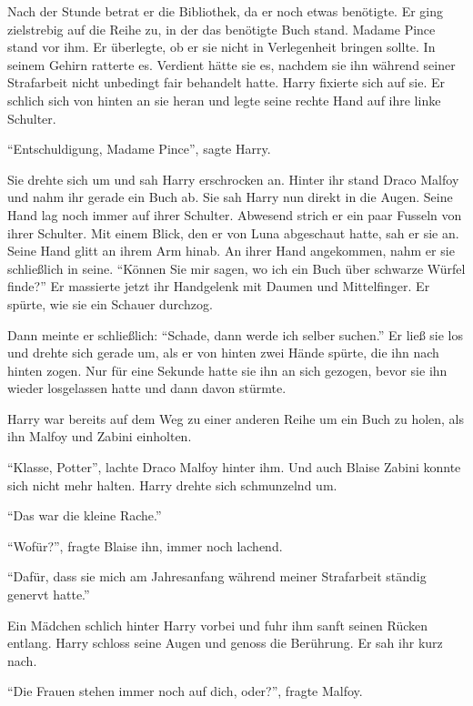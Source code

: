 Nach der Stunde betrat er die Bibliothek, da er noch etwas benötigte. Er ging zielstrebig auf die Reihe zu, in der das benötigte Buch stand. Madame Pince stand vor ihm. Er überlegte, ob er sie nicht in Verlegenheit bringen sollte. In seinem Gehirn ratterte es. Verdient hätte sie es, nachdem sie ihn während seiner Strafarbeit nicht unbedingt fair behandelt hatte. Harry fixierte sich auf sie. Er schlich sich von hinten an sie heran und legte seine rechte Hand auf ihre linke Schulter.

\enquote{Entschuldigung, Madame Pince}, sagte Harry.

Sie drehte sich um und sah Harry erschrocken an. Hinter ihr stand Draco Malfoy und nahm ihr gerade ein Buch ab. Sie sah Harry nun direkt in die Augen. Seine Hand lag noch immer auf ihrer Schulter. Abwesend strich er ein paar Fusseln von ihrer Schulter. Mit einem Blick, den er von Luna abgeschaut hatte, sah er sie an. Seine Hand glitt an ihrem Arm hinab. An ihrer Hand angekommen, nahm er sie schließlich in seine. \enquote{Können Sie mir sagen, wo ich ein Buch über schwarze Würfel finde?} Er massierte jetzt ihr Handgelenk mit Daumen und Mittelfinger. Er spürte, wie sie ein Schauer durchzog.

Dann meinte er schließlich: \enquote{Schade, dann werde ich selber suchen.} Er ließ sie los und drehte sich gerade um, als er von hinten zwei Hände spürte, die ihn nach hinten zogen. Nur für eine Sekunde hatte sie ihn an sich gezogen, bevor sie ihn wieder losgelassen hatte und dann davon stürmte.

Harry war bereits auf dem Weg zu einer anderen Reihe um ein Buch zu holen, als ihn Malfoy und Zabini einholten.

\enquote{Klasse, Potter}, lachte Draco Malfoy hinter ihm. Und auch Blaise Zabini konnte sich nicht mehr halten. Harry drehte sich schmunzelnd um.

\enquote{Das war die kleine Rache.}

\enquote{Wofür?}, fragte Blaise ihn, immer noch lachend.

\enquote{Dafür, dass sie mich am Jahresanfang während meiner Strafarbeit ständig genervt hatte.}

Ein Mädchen schlich hinter Harry vorbei und fuhr ihm sanft seinen Rücken entlang. Harry schloss seine Augen und genoss die Berührung. Er sah ihr kurz nach. 

\enquote{Die Frauen stehen immer noch auf dich, oder?}, fragte Malfoy.

